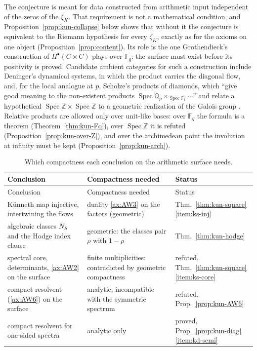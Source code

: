 \documentclass[11pt]{amsart}
\theoremstyle{plain}
\theoremstyle{definition}
\theoremstyle{remark}
\numberwithin{equation}{section}
\newcommand{\Q}{\mathbb{Q}}
\newcommand{\Z}{\mathbb{Z}}
\newcommand{\F}{\mathbb{F}}
\DeclareMathOperator{\Spec}{Spec}
\begin{document}
The conjecture is meant for data constructed from arithmetic input
independent of the zeros of the $\xi_K$. That requirement is not a
mathematical condition, and Proposition~\ref{prop:kun-collapse} below
shows that without it the conjecture is equivalent to the Riemann
hypothesis for every $\zeta_K$, exactly as for the axioms on one object
(Proposition~\ref{prop:content}). Its role is the one Grothendieck's
construction of $H^\bullet(C\times C)$ plays over $\F_q$: the surface
must exist before its positivity is proved. Candidate ambient
categories for such a construction include Deninger's dynamical
systems, in which the product carries the diagonal flow, and, for the
local analogue at $p$, Scholze's products of diamonds, which ``give good
meaning to the non-existent products $\Spec\Q_p\times_{\Spec\F_1}
\cdots$'' and relate a hypothetical $\Spec\Z\times\Spec\Z$ to a
geometric realization of the Galois group
\cite[\S6, pp.~13--14]{Scholze2018PadicGeometry}. Relative products are
allowed only over unit-like bases: over $\F_q$ the formula is a theorem
(Theorem~\ref{thm:kun-Fq}), over $\Spec\Z$ it is refuted
(Proposition~\ref{prop:kun-over-Z}), and over the archimedean point the
involution at infinity must be kept (Proposition~\ref{prop:kun-arch}).

{\small
\begin{longtable}{@{}>{\raggedright\arraybackslash}p{}
>{\raggedright\arraybackslash}p{}
>{\raggedright\arraybackslash}p{}@{}}
\caption{Which compactness each conclusion on the arithmetic surface
needs.}\label{tab:compactness}\\
\toprule
Conclusion & Compactness needed & Status\\
\midrule
\endfirsthead
\toprule
Conclusion & Compactness needed & Status\\
\midrule
\endhead
\bottomrule
\endfoot
K\"unneth map injective, intertwining the flows & duality \ref{ax:AW3}
on the factors (geometric) & Thm.~\ref{thm:kun-square}\ref{item:ks-inj}\\
algebraic classes $N_S$ and the Hodge index clause & geometric: the
classes pair $\rho$ with $1-\rho$ & Thm.~\ref{thm:kun-hodge}\\
spectral core, determinants, \ref{ax:AW2} on the surface & finite
multiplicities: contradicted by geometric compactness &
refuted, Thm.~\ref{thm:kun-square}\ref{item:ks-core}\\
compact resolvent (\ref{ax:AW6}) on the surface & analytic;
incompatible with the symmetric spectrum & refuted,
Prop.~\ref{prop:kun-AW6}\\
compact resolvent for one-sided spectra & analytic only & proved,
Prop.~\ref{prop:kun-diag}\ref{item:kd-semi}\\
\end{longtable}
}
\end{document}
